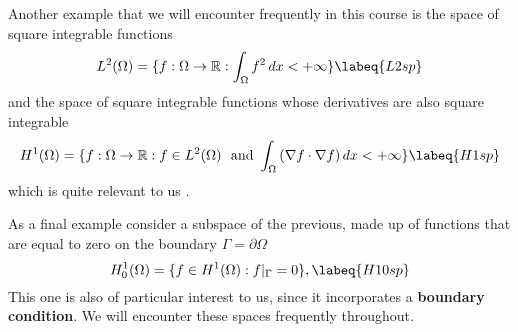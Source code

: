Another example that we will encounter frequently in this course is the space of
square integrable functions
\begin{equation}
L^2(\Omega) = \{f: \Omega \rightarrow \mathbb{R} : \int_{\Omega} f^2\,dx < +\infty\} \labeq{L2sp}
\end{equation}
and the space of square integrable functions whose derivatives are also
square integrable
\begin{equation}
H^1(\Omega) = \{f: \Omega \rightarrow \mathbb{R} : f \in L^2(\Omega)~~\mbox{and}~ \int_{\Omega}{(\nabla{f}\cdot\nabla{f})} \,dx < +\infty\} \labeq{H1sp}
\end{equation}
which is quite relevant to us .

As a final example consider a subspace of the previous, made up of functions
that are equal to zero on the boundary $\Gamma = \partial{\Omega}$
\begin{equation}
H^1_0(\Omega) = \{f \in H^1(\Omega) : f|_{\Gamma} = 0 \}, \labeq{H10sp}
\end{equation}
This one is also of particular interest to us, since it incorporates
a \textbf{boundary condition}. We will encounter these
spaces frequently throughout.


\bigskip

